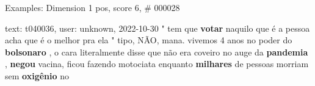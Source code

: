 \begin{frame}{Examples: Dimension 1 pos, score 6, \# 000028}
\footnotesize
\begin{exampleblock}{text: t040036, user: unknown, 2022-10-30}
" tem que \textbf{votar} naquilo que é a pessoa acha que é o melhor pra ela " 
tipo, NÃO, mana. vivemos 4 anos no poder do \textbf{bolsonaro} , o cara 
literalmente disse que não era coveiro no auge da \textbf{pandemia} , 
\textbf{negou} vacina, ficou fazendo motociata enquanto \textbf{milhares} de 
pessoas morriam sem \textbf{oxigênio} no 
\end{exampleblock}
\end{frame}
